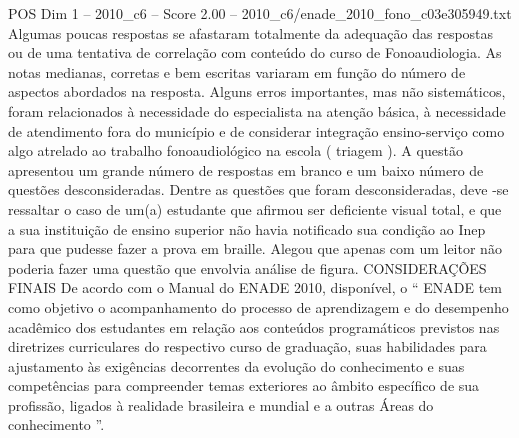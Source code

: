 \begin{textsample}{POS Dim 1 – 2010\_c6 – Score 2.00 – 2010\_c6/enade\_2010\_fono\_c03e305949.txt}
Algumas poucas respostas se afastaram totalmente da adequação das respostas ou de uma tentativa de correlação com conteúdo do curso de Fonoaudiologia.
As notas medianas, corretas e bem escritas variaram em função do número de aspectos abordados na resposta.
Alguns erros importantes, mas não sistemáticos, foram relacionados à necessidade do especialista na atenção básica, à necessidade de atendimento fora do município e de considerar integração ensino-serviço como algo atrelado ao trabalho fonoaudiológico na escola ( triagem ).
A questão apresentou um grande número de respostas em branco e um baixo número de questões desconsideradas.
Dentre as questões que foram desconsideradas, deve -se ressaltar o caso de um(a) estudante que afirmou ser deficiente visual total, e que a sua instituição de ensino superior não havia notificado sua condição ao Inep para que pudesse fazer a prova em braille.
Alegou que apenas com um leitor não poderia fazer uma questão que envolvia análise de figura.
CONSIDERAÇÕES FINAIS De acordo com o Manual do ENADE 2010, disponível, o “ ENADE tem como objetivo o acompanhamento do processo de aprendizagem e do desempenho acadêmico dos estudantes em relação aos conteúdos programáticos previstos nas diretrizes curriculares do respectivo curso de graduação, suas habilidades para ajustamento às exigências decorrentes da evolução do conhecimento e suas competências para compreender temas exteriores ao âmbito específico de sua profissão, ligados à realidade brasileira e mundial e a outras Áreas do conhecimento ”.

\end{textsample}
